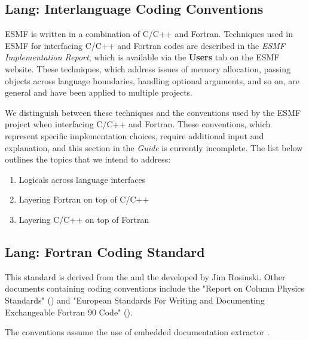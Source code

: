 
\subsection{Lang: Interlanguage Coding Conventions}

ESMF is written in a combination of C/C++ and Fortran.
Techniques used in ESMF for interfacing C/C++ and Fortran codes
are described in the {\it ESMF Implementation Report}\cite{bib:ESMFimplrep},
which is available via the {\bf Users} tab on the ESMF website.  These
techniques, which address issues of memory allocation, passing
objects across language boundaries, handling optional arguments,
and so on, are general and have been applied to multiple projects.  

We distinguish between these techniques and the conventions used
by the ESMF project when interfacing C/C++ and Fortran.  These
conventions, which represent specific implementation choices,
require additional input and explanation, and this section in 
the {\it Guide} is currently incomplete.  The list below outlines
the topics that we intend to address:

\begin{enumerate}
\item Logicals across language interfaces
\item Layering Fortran on top of C/C++
\item Layering C/C++ on top of Fortran
\end{enumerate}

\subsection{Lang: Fortran Coding Standard}
\label{sec:code_conv_cam}

This standard is derived from the  and the
developed by Jim Rosinski. Other documents containing coding
conventions include the "Report on Column Physics Standards"
()
and "European Standards For Writing and Documenting Exchangeable
Fortran 90 Code"
().

The conventions assume the use of embedded documentation extractor
.

